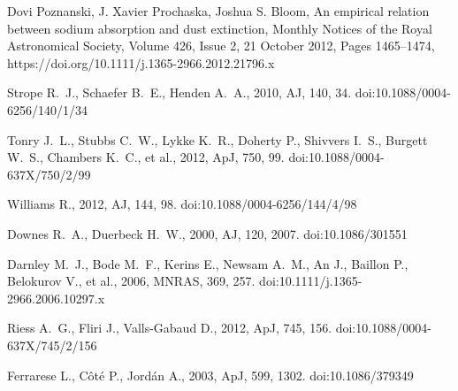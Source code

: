 \documentclass{tda}
\begin{document}
	\begin{thebibliography}{99}
		Dovi Poznanski, J. Xavier Prochaska, Joshua S. Bloom, An empirical relation between sodium absorption and dust extinction, Monthly Notices of the Royal Astronomical Society, Volume 426, Issue 2, 21 October 2012, Pages 1465–1474, https://doi.org/10.1111/j.1365-2966.2012.21796.x

		 Strope R.~J., Schaefer B.~E., Henden A.~A., 2010, AJ, 140, 34. doi:10.1088/0004-6256/140/1/34

		 Tonry J.~L., Stubbs C.~W., Lykke K.~R., Doherty P., Shivvers I.~S., Burgett W.~S., Chambers K.~C., et al., 2012, ApJ, 750, 99. doi:10.1088/0004-637X/750/2/99

		 Williams R., 2012, AJ, 144, 98. doi:10.1088/0004-6256/144/4/98

		 Downes R.~A., Duerbeck H.~W., 2000, AJ, 120, 2007. doi:10.1086/301551

		 Darnley M.~J., Bode M.~F., Kerins E., Newsam A.~M., An J., Baillon P., Belokurov V., et al., 2006, MNRAS, 369, 257. doi:10.1111/j.1365-2966.2006.10297.x

		 Riess A.~G., Fliri J., Valls-Gabaud D., 2012, ApJ, 745, 156. doi:10.1088/0004-637X/745/2/156

		 Ferrarese L., C{\^o}t{\'e} P., Jord{\'a}n A., 2003, ApJ, 599, 1302. doi:10.1086/379349

	\end{thebibliography}

	
\end{document}

